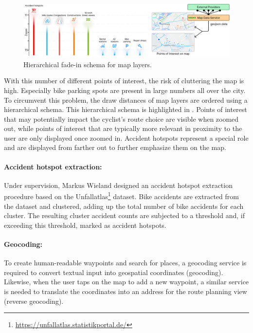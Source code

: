 \begin{figure}[htbp]
\centering
\includegraphics[width=\linewidth]{images/points-of-interest.png}
\caption{Hierarchical fade-in schema for map layers.}
\label{fig:points-of-interest}
\end{figure}

With this number of different points of interest, the risk of cluttering the map is high. Especially bike parking spots are present in large numbers all over the city. To circumvent this problem, the draw distances of map layers are ordered using a hierarchical schema. This hierarchical schema is highlighted in . Points of interest that may potentially impact the cyclist's route choice are visible when zoomed out, while points of interest that are typically more relevant in proximity to the user are only displayed once zoomed in. Accident hotspots represent a special role and are displayed from farther out to further emphasize them on the map.

\paragraph{Accident hotspot extraction:} Under supervision, Markus Wieland \cite{wieland_2022} designed an accident hotspot extraction procedure based on the Unfallatlas\footnote{\url{https://unfallatlas.statistikportal.de/}} dataset. Bike accidents are extracted from the dataset and clustered, adding up the total number of bike accidents for each cluster. The resulting cluster accident counts are subjected to a threshold and, if exceeding this threshold, marked as accident hotspots.

\paragraph{Geocoding:} To create human-readable waypoints and search for places, a geocoding service is required to convert textual input into geospatial coordinates (geocoding). Likewise, when the user taps on the map to add a new waypoint, a similar service is needed to translate the coordinates into an address for the route planning view (reverse geocoding).


